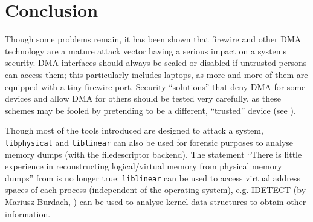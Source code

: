 %
%

\section{Conclusion}

Though some problems remain, it has been shown that firewire and other DMA
technology are a mature attack vector having a serious impact on a systems
security. DMA interfaces should always be sealed or disabled if untrusted
persons can access them; this particularly includes laptops, as more and more of
them are equipped with a tiny firewire port. Security ``solutions'' that deny
DMA for some devices and allow DMA for others should be tested very carefully,
as these schemes may be fooled by pretending to be a different, ``trusted''
device (see \cite{rux2k6firewire:2006}).

Though most of the tools introduced are designed to attack a system,
\texttt{libphysical} and \texttt{liblinear} can also be used for forensic
purposes to analyse memory dumps (with the filedescriptor backend). The
statement ``There is little experience in reconstructing logical/virtual memory
from physical memory dumps'' from \cite{cansecwest_firewire:2005} is no longer
true: \texttt{liblinear} can be used to access virtual address spaces of each
process (independent of the operating system), e.g\@. IDETECT (by Mariusz
Burdach, \cite{finding_digital_evidence_in_physical_memory:2006}) can be used to
analyse kernel data structures to obtain other information.

